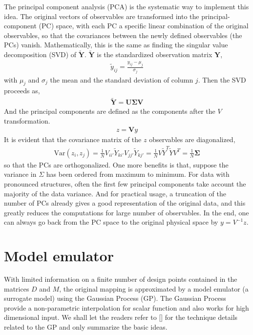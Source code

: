 The principal component analysis (PCA) is the systematic way to implement this idea.
The original vectors of observables are transformed into the principal-component (PC) space, with each PC a specific linear combination of the original observables, so that the covariances between the newly defined observables (the PCs) vanish.
Mathematically, this is the same as finding the singular value decomposition (SVD) of $\mathbf{\tilde{Y}}$. 
$\mathbf{\tilde{Y}}$ is the standardized observation matrix $\mathbf{Y}$,
\begin{eqnarray}
\tilde{y}_{ij} = \frac{y_{ij} - \mu_j}{\sigma_j}
\end{eqnarray}
with $\mu_j$ and $\sigma_j$ the mean and the standard deviation of column $j$.
Then the SVD proceeds as,
\begin{eqnarray}
\tilde{\mathbf{Y}} = \mathbf{U} \mathbf{\Sigma} \mathbf{V}
\end{eqnarray}
And the principal components are defined as the components after the $V$ transformation.
\begin{eqnarray}
z = \mathbf{V}y
\end{eqnarray}
It is evident that the covariance matrix of the $z$ observables are diagonalized,
\begin{eqnarray}
\mathrm{Var}(z_i, z_j) = \frac{1}{N}V_{ii'}\tilde{Y}_{ki'}V_{jj'}\tilde{Y}_{kj'} = \frac{1}{N}V\tilde{Y}^T\tilde{Y}V^T = \frac{1}{N}\mathbf{\Sigma}
\end{eqnarray}
so that the PCs are orthogonalized.
One more benefits is that, suppose the variance in $\Sigma$ has been ordered from maximum to minimum.
For data with pronounced structures, often the first few principal components take account the majority of the data variance.
And for practical usage, a truncation of the number of PCs already gives a good representation of the original data, and this greatly reduces the computations for large number of observables.
In the end, one can always go back from the PC space to the original physical space by $y = V^{-1} z$.

\section{Model emulator}
With limited information on a finite number of design points contained in the matrices $D$ and $M$, the original mapping is approximated by a model emulator (a surrogate model) using the Gaussian Process (GP).
The Gaussian Process provide a non-parametric interpolation for scalar function and also works for high dimensional input.
We shall let the readers refer to [] for the technique details related to the GP and only summarize the basic ideas.

